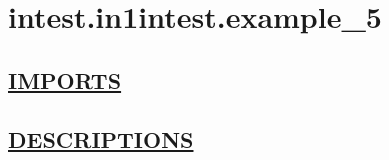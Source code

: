 \chapter*{intest.in1intest.example\_5}

\section*{\underline{IMPORTS}}

\section*{\underline{DESCRIPTIONS}}
